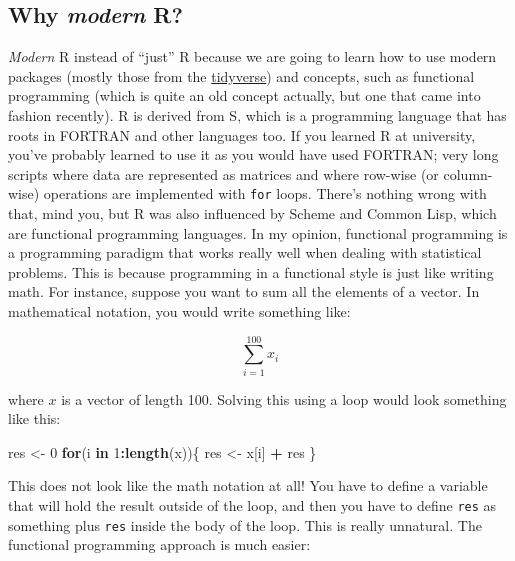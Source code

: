 \documentclass[
]{article}
\newenvironment{Shaded}{\begin{snugshade}}{\end{snugshade}}
\newcommand{\ControlFlowTok}[1]{\textcolor[rgb]{0.13,0.29,0.53}{\textbf{#1}}}
\newcommand{\DecValTok}[1]{\textcolor[rgb]{0.00,0.00,0.81}{#1}}
\newcommand{\KeywordTok}[1]{\textcolor[rgb]{0.13,0.29,0.53}{\textbf{#1}}}
\newcommand{\NormalTok}[1]{#1}
\newcommand{\OperatorTok}[1]{\textcolor[rgb]{0.81,0.36,0.00}{\textbf{#1}}}
\newcommand{\StringTok}[1]{\textcolor[rgb]{0.31,0.60,0.02}{#1}}
\begin{document}
\hypertarget{why-modern-r}{%
\subsection*{\texorpdfstring{Why \emph{modern} R?}{Why modern R?}}\label{why-modern-r}}

\emph{Modern} R instead of ``just'' R because we are going to learn how to use modern packages (mostly
those from the \href{https://www.tidyverse.org/}{tidyverse}) and concepts, such as functional
programming (which is quite an old concept actually, but one that came into fashion recently). R is
derived from S, which is a programming language that has roots in FORTRAN and other languages too.
If you learned R at university, you've probably learned to use it as you would have used FORTRAN;
very long scripts where data are represented as matrices and where row-wise (or column-wise)
operations are implemented with \texttt{for} loops. There's nothing wrong with that, mind you, but R
was also influenced by Scheme and Common Lisp, which are functional programming languages.
In my opinion, functional programming is a programming paradigm that works really well when dealing
with statistical problems. This is because programming in a functional style is just like
writing math. For instance, suppose you want to sum all the elements of a vector. In mathematical
notation, you would write something like:

\[
\sum_{i = 1}^{100} x_{i}
\]

where \(x\) is a vector of length 100. Solving this using a loop would look something like this:

\begin{Shaded}
\begin{Highlighting}[]
\NormalTok{res \textless{}{-}}\StringTok{ }\DecValTok{0}
\ControlFlowTok{for}\NormalTok{(i }\ControlFlowTok{in} \DecValTok{1}\OperatorTok{:}\KeywordTok{length}\NormalTok{(x))\{}
\NormalTok{  res \textless{}{-}}\StringTok{ }\NormalTok{x[i] }\OperatorTok{+}\StringTok{ }\NormalTok{res}
\NormalTok{\}}
\end{Highlighting}
\end{Shaded}

This does not look like the math notation at all! You have to define a variable that will hold
the result outside of the loop, and then you have to define \texttt{res} as something plus \texttt{res} inside
the body of the loop. This is really unnatural. The functional programming approach is much
easier:
\end{document}
